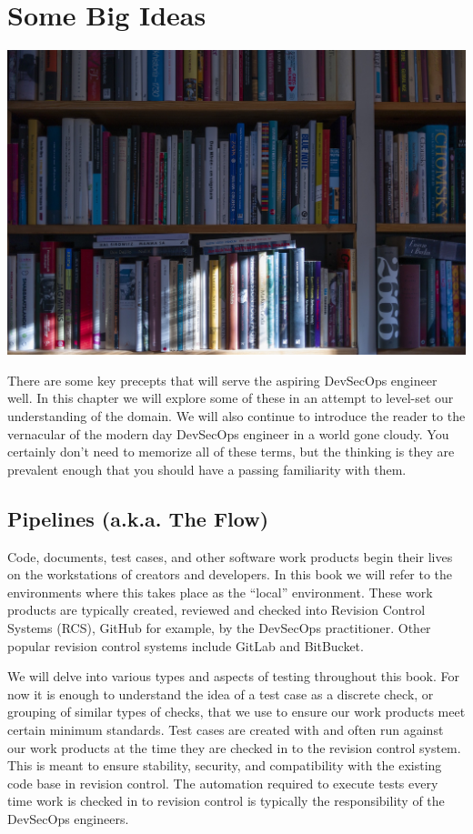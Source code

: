\chapter{Some Big Ideas}

\centering
\includegraphics{../images/book-5104342_1920.jpg}

\justify{}
There are some key precepts that will serve the aspiring DevSecOps engineer well. In this
chapter we will explore some of these in an attempt to level-set our understanding of the
domain. We will also continue to introduce the reader to the vernacular of the modern day
DevSecOps engineer in a world gone cloudy. You certainly don't need to memorize all of 
these terms, but the thinking is they are prevalent enough that you should have a passing 
familiarity with them. 

\section{Pipelines (a.k.a. The Flow)}

\justify{}
Code, documents, test cases, and other software work products begin their lives on the
workstations of creators and developers. In this book we will refer to the environments
where this takes place as the ``local'' environment. These work products are typically created,
reviewed and
checked into Revision Control Systems (RCS),
GitHub for example, by the DevSecOps practitioner.
Other popular revision control systems include GitLab and
BitBucket.

\justify{}
We will delve into various types and aspects of testing
throughout this book. For now it is enough to understand the idea of
a test case as a discrete check, or grouping of similar types of
checks, that we use to ensure our work products meet certain minimum
standards.  Test cases are created with and often run against our
work products at the time they are checked in to the revision control
system. This is meant to ensure stability, security, and compatibility
with the existing code base in revision control. The automation required
to execute tests every time work is checked in to revision control is
typically the responsibility of the DevSecOps engineers.

